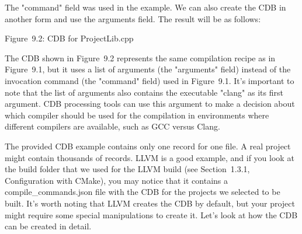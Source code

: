 The "command" field was used in the example. We can also create the CDB in another form and use the arguments field. The result will be as follows:

\begin{shell}
\end{shell}

\begin{center}
Figure 9.2: CDB for ProjectLib.cpp
\end{center}

The CDB shown in Figure 9.2 represents the same compilation recipe as in Figure 9.1, but it uses a list of arguments (the "arguments" field) instead of the invocation command (the "command" field) used in Figure 9.1. It's important to note that the list of arguments also contains the executable "clang" as its first argument. CDB processing tools can use this argument to make a decision about which compiler should be used for the compilation in environments where different compilers are available, such as GCC versus Clang.

The provided CDB example contains only one record for one file. A real project might contain thousands of records. LLVM is a good example, and if you look at the build folder that we used for the LLVM build (see Section 1.3.1, Configuration with CMake), you may notice that it contains a compile\_commands.json file with the CDB for the projects we selected to be built. It's worth noting that LLVM creates the CDB by default, but your project might require some special manipulations to create it. Let's look at how the CDB can be created in detail.
